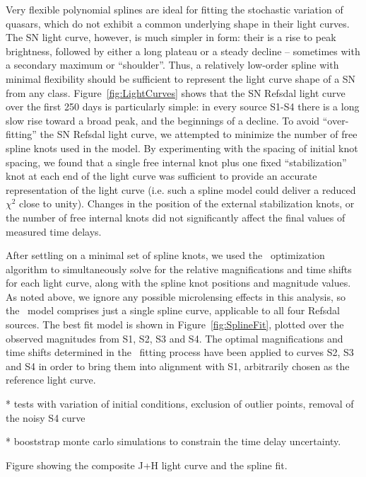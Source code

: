 Very flexible polynomial splines are ideal for fitting the stochastic variation of quasars, which do not exhibit a common underlying shape in their light curves.  The SN light curve, however, is much simpler in form: their is a rise to peak brightness, followed by either a long plateau or a steady decline -- sometimes with a secondary maximum or ``shoulder''.  Thus, a relatively low-order spline with minimal flexibility should be sufficient to represent the light curve shape of a SN from any class.  Figure~\ref{fig:LightCurves} shows that the SN Refsdal light curve over the first 250 days is particularly simple: in every source S1-S4 there is a long slow rise toward a broad peak, and the beginnings of a decline.  To avoid ``over-fitting'' the SN Refsdal light curve, we attempted to minimize the number of free spline knots used in the \pycs model.  By experimenting with the spacing of initial knot spacing, we found that a single free internal knot plus one fixed ``stabilization'' knot at each end of the light curve was sufficient to provide an accurate representation of the light curve (i.e. such a spline model could deliver a reduced $\chi^2$ close to unity).  Changes in the position of the external stabilization knots, or the number of free internal  knots did not significantly affect the final values of measured time delays. 

After settling on a minimal set of spline knots, we used the \pycs\ optimization algorithm to simultaneously solve for the relative magnifications and time shifts for each light curve, along with the spline knot positions and magnitude values.   As noted above, we ignore any possible microlensing effects in this analysis, so the \pycs\ model comprises just a single spline curve, applicable to all four Refsdal sources. The best fit model is shown in Figure~\ref{fig:SplineFit}, plotted over the observed magnitudes from S1, S2, S3 and S4.  The optimal magnifications and time shifts determined in the \pycs\ fitting process have been applied to curves S2, S3 and S4 in order to bring them into alignment with S1, arbitrarily chosen as the reference light curve.


 * tests with variation of initial conditions, exclusion of outlier points, removal of the noisy S4 curve

 * booststrap monte carlo simulations to constrain the time delay uncertainty.
 
Figure showing the composite J+H light curve and the spline fit. 



